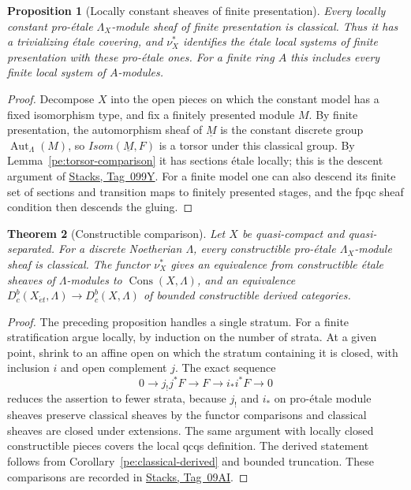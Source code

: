 \documentclass[11pt,a4paper]{article}
\numberwithin{equation}{section}
\newtheorem{theorem}{Theorem}[section]
\newtheorem{proposition}[theorem]{Proposition}
\theoremstyle{definition}
\theoremstyle{remark}
\newcommand{\Dbc}{D^b_c}
\newcommand{\et}{\acute{e}t}
\newcommand{\stacks}[1]{\href{https://stacks.math.columbia.edu/tag/#1}{\textnormal{Stacks, Tag~#1}}}
\newcommand{\Cons}{\operatorname{Cons}}
\begin{document}
\begin{proposition}[Locally constant sheaves of finite presentation]
\label{pe:finite-local-systems}
Every locally constant pro-\'etale $\Lambda_X$-module sheaf of finite
presentation is classical. Thus it has a trivializing \'etale
covering, and $\nu_X^*$ identifies the \'etale local systems of finite
presentation with these pro-\'etale ones. For a finite ring $A$ this includes every
finite local system of $A$-modules.
\end{proposition}
\begin{proof}
Decompose $X$ into the open pieces on which the constant model has a
fixed isomorphism type, and fix a finitely presented module $M$. By
finite presentation, the automorphism sheaf of $\underline M$ is the
constant discrete group $\operatorname{Aut}_\Lambda(M)$, so
$\mathit{Isom}(\underline M,F)$ is a torsor under this classical
group. By Lemma~\ref{pe:torsor-comparison} it has sections \'etale
locally; this is the descent argument of \stacks{099Y}. For a finite
model one can also descend its finite set of sections and transition
maps to finitely presented stages, and the fpqc sheaf condition then
descends the gluing.
\end{proof}

\begin{theorem}[Constructible comparison]
\label{pe:constructible-comparison}
Let $X$ be quasi-compact and quasi-separated. For a discrete
Noetherian $\Lambda$, every constructible
pro-\'etale $\Lambda_X$-module sheaf is classical. The functor
$\nu_X^*$ gives an equivalence from constructible \'etale sheaves of
$\Lambda$-modules to $\Cons(X,\Lambda)$, and an equivalence
$D^b_c(X_{\et},\Lambda)\to\Dbc(X,\Lambda)$ of bounded constructible
derived categories.
\end{theorem}
\begin{proof}
The preceding proposition handles a single stratum. For a finite
stratification argue locally, by induction on the number of strata.
At a given point, shrink to an affine open on which the stratum
containing it is closed, with inclusion $i$ and open complement $j$.
The exact sequence
\[
 0\longrightarrow j_!j^*F\longrightarrow F
   \longrightarrow i_*i^*F\longrightarrow0
\]
reduces the assertion to fewer strata, because $j_!$ and $i_*$ on
pro-\'etale module sheaves preserve classical sheaves by the functor comparisons and classical
sheaves are closed under extensions. The same argument with locally
closed constructible pieces covers the local qcqs definition. The
derived statement follows from Corollary~\ref{pe:classical-derived}
and bounded truncation. These comparisons are recorded in
\stacks{09AI}.
\end{proof}
\end{document}
